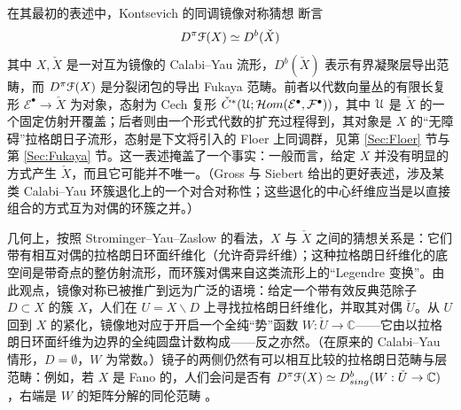 \documentclass[11pt,a4paper]{article}
\numberwithin{equation}{section}
\newcommand{\bC}{\mathbb{C}}
\newcommand{\scrF}{\EuScript{F}}
\newcommand{\Cech}[1]{\check{#1}}
\begin{document}

在其最初的表述中，Kontsevich 的同调镜像对称猜想 \cite{Kontsevich} 断言
\begin{equation} \label{Eqn:HMS}
D^{\pi}\scrF(X) \simeq D^b(\Cech{X})
\end{equation}
其中 $X, \Cech{X}$ 是一对互为镜像的 Calabi--Yau 流形，$D^b(\Cech{X})$ 表示有界凝聚层导出范畴，而 $D^{\pi}\scrF(X)$ 是分裂闭包的导出 Fukaya 范畴。前者以代数向量丛的有限长复形 $\mathcal{E}^{\bullet} \rightarrow \Cech{X}$ 为对象，态射为 Cech 复形 $\Cech{C}^*(\EuScript{U}; \mathcal{H}om(\mathcal{E}^{\bullet}, \mathcal{F}^{\bullet}))$，其中 $\EuScript{U}$ 是 $\Cech{X}$ 的一个固定仿射开覆盖；后者则由一个形式代数的扩充过程得到，其对象是 $X$ 的“无障碍”拉格朗日子流形，态射是下文将引入的 Floer 上同调群，见第 \ref{Sec:Floer} 节与第 \ref{Sec:Fukaya} 节。这一表述掩盖了一个事实：一般而言，给定 $X$ 并没有明显的方式产生 $\Cech{X}$，而且它可能并不唯一。（Gross 与 Siebert \cite{GrossSiebert} 给出的更好表述，涉及某类 Calabi--Yau 环簇退化上的一个对合对称性；这些退化的中心纤维应当是以直接组合的方式互为对偶的环簇之并。）



几何上，按照 Strominger--Yau--Zaslow \cite{SYZ} 的看法，$X$ 与 $\Cech{X}$ 之间的猜想关系是：它们带有相互对偶的拉格朗日环面纤维化（允许奇异纤维）；这种拉格朗日纤维化的底空间是带奇点的整仿射流形，而环簇对偶来自这类流形上的“Legendre 变换”。由此观点，镜像对称已被推广到远为广泛的语境：给定一个带有效反典范除子 $D\subset X$ 的簇 $X$，人们在 $U=X\backslash D$ 上寻找拉格朗日纤维化，并取其对偶 $\Cech{U}$。从 $U$ 回到 $X$ 的紧化，镜像地对应于开启一个全纯“势”函数 $W: \Cech{U}\rightarrow \bC$——它由以拉格朗日环面纤维为边界的全纯圆盘计数构成——反之亦然。（在原来的 Calabi--Yau 情形，$D = \emptyset$，$W$ 为常数。）镜子的两侧仍然有可以相互比较的拉格朗日范畴与层范畴：例如，若 $X$ 是 Fano 的，人们会问是否有 $D^{\pi}\scrF(X) \simeq D^b_{sing}(W:\Cech{U} \rightarrow \bC)$，右端是 $W$ 的矩阵分解的同伦范畴 \cite{Orlov:Dbsing}。
\end{document}
